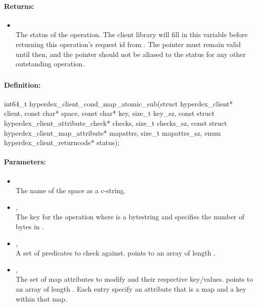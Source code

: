 \paragraph{Returns:}
\begin{itemize}[noitemsep]
\item {}\\
The status of the operation.  The client library will fill in this variable before returning this operation's request id from .  The pointer must remain valid until then, and the pointer should not be aliased to the status for any other outstanding operation.
\end{itemize}

\pagebreak
\subsubsection{}
\label{api:c:cond_map_atomic_sub}


\paragraph{Definition:}
\begin{ccode}
int64_t hyperdex_client_cond_map_atomic_sub(struct hyperdex_client* client,
        const char* space,
        const char* key, size_t key_sz,
        const struct hyperdex_client_attribute_check* checks, size_t checks_sz,
        const struct hyperdex_client_map_attribute* mapattrs, size_t mapattrs_sz,
        enum hyperdex_client_returncode* status);
\end{ccode}

\paragraph{Parameters:}
\begin{itemize}[noitemsep]
\item {}\\
The name of the space as a c-string.
\item {}, \\
The key for the operation where  is a bytestring and  specifies the number of bytes in .
\item {}, \\
A set of predicates to check against.   points to an array of length .
\item {}, \\
The set of map attributes to modify and their respective key/values.   points to an array of length .  Each entry specify an attribute that is a map and a key within that map.
\end{itemize}

